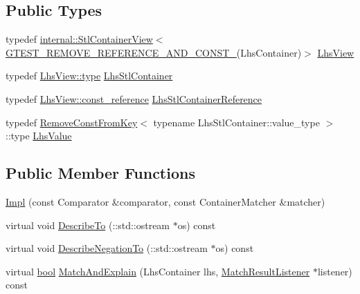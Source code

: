 \subsection*{Public Types}
\begin{DoxyCompactItemize}
\item 
typedef \hyperlink{classtesting_1_1internal_1_1StlContainerView}{internal\+::\+Stl\+Container\+View}$<$ \hyperlink{gtest-internal_8h_a874567b176266188fabfffb8393267ce}{G\+T\+E\+S\+T\+\_\+\+R\+E\+M\+O\+V\+E\+\_\+\+R\+E\+F\+E\+R\+E\+N\+C\+E\+\_\+\+A\+N\+D\+\_\+\+C\+O\+N\+S\+T\+\_\+}(Lhs\+Container)$>$ \hyperlink{classtesting_1_1internal_1_1WhenSortedByMatcher_1_1Impl_a4c84fddfe1bf967a73e5dae1940db427}{Lhs\+View}
\item 
typedef \hyperlink{classtesting_1_1internal_1_1StlContainerView_a2b2c63a6dcdbfe63fb0ee121ebf463ba}{Lhs\+View\+::type} \hyperlink{classtesting_1_1internal_1_1WhenSortedByMatcher_1_1Impl_a2cb1a8d85ca2c376b6abdbcb00d84759}{Lhs\+Stl\+Container}
\item 
typedef \hyperlink{classtesting_1_1internal_1_1StlContainerView_a9cd4f6ed689b3938cdb7b3c4cbf1b36b}{Lhs\+View\+::const\+\_\+reference} \hyperlink{classtesting_1_1internal_1_1WhenSortedByMatcher_1_1Impl_ab5e53a762bb213ccf84299b31c825b58}{Lhs\+Stl\+Container\+Reference}
\item 
typedef \hyperlink{structtesting_1_1internal_1_1RemoveConstFromKey}{Remove\+Const\+From\+Key}$<$ typename Lhs\+Stl\+Container\+::value\+\_\+type $>$\+::type \hyperlink{classtesting_1_1internal_1_1WhenSortedByMatcher_1_1Impl_a93044f4ba53373fcfc424132b5e6c462}{Lhs\+Value}
\end{DoxyCompactItemize}
\subsection*{Public Member Functions}
\begin{DoxyCompactItemize}
\item 
\hyperlink{classtesting_1_1internal_1_1WhenSortedByMatcher_1_1Impl_a63235e98dec5478b7ff9d06f6babc716}{Impl} (const Comparator \&comparator, const Container\+Matcher \&matcher)
\item 
virtual void \hyperlink{classtesting_1_1internal_1_1WhenSortedByMatcher_1_1Impl_a33f7b8bdce4adb02618e90ac2ec949f9}{Describe\+To} (\+::std\+::ostream $\ast$os) const
\item 
virtual void \hyperlink{classtesting_1_1internal_1_1WhenSortedByMatcher_1_1Impl_a0a59f77fdbb88a6326e5aba671f2aa3e}{Describe\+Negation\+To} (\+::std\+::ostream $\ast$os) const
\item 
virtual \hyperlink{classbool}{bool} \hyperlink{classtesting_1_1internal_1_1WhenSortedByMatcher_1_1Impl_a9d8f57c729df8c041f2fd7febbc950da}{Match\+And\+Explain} (Lhs\+Container lhs, \hyperlink{classtesting_1_1MatchResultListener}{Match\+Result\+Listener} $\ast$listener) const
\end{DoxyCompactItemize}
